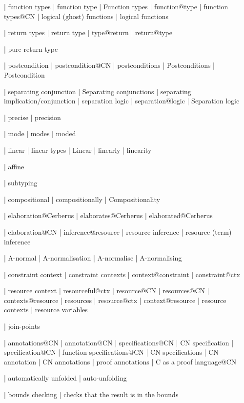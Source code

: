 | function types
 | function type
 | Function types
 | function@type
 | function types@CN
 | logical (ghost) functions
 | logical functions

 | return types
 | return type
 | type@return
 | return@type

 | pure return type

 | postcondition
 | postcondition@CN
 | postconditions
 | Postconditions
 | Postcondition

 | separating conjunction
 | Separating conjunctions
 | separating implication/conjunction
 | separation logic
 | separation@logic
 | Separation logic

 | precise
 | precision

 | mode
 | modes
 | moded

 | linear
 | linear types
 | Linear
 | linearly
 | linearity

 | affine

 | subtyping

 | compositional
 | compositionally
 | Compositionality

 | elaboration@Cerberus
 | elaborates@Cerberus
 | elaborated@Cerberus

 | elaboration@CN
 | inference@resource
 | resource inference
 | resource (term) inference

 | A-normal
 | A-normalisation
 | A-normalise
 | A-normalising

 | constraint context
 | constraint contexts
 | context@constraint
 | constraint@ctx

 | resource context
 | resourceful@ctx
 | resource@CN
 | resources@CN
 | contexts@resource
 | resources
 | resource@ctx
 | context@resource
 | resource contexts
 | resource variables

 | join-points

 | annotations@CN
 | annotation@CN
 | specifications@CN
 | CN specification
 | specification@CN
 | function specifications@CN
 | CN specifications
 | CN annotation
 | CN annotations
 | proof annotations
 | C as a proof language@CN

 | automatically unfolded
 | auto-unfolding

 | bounds checking
 | checks that the result is in the bounds

